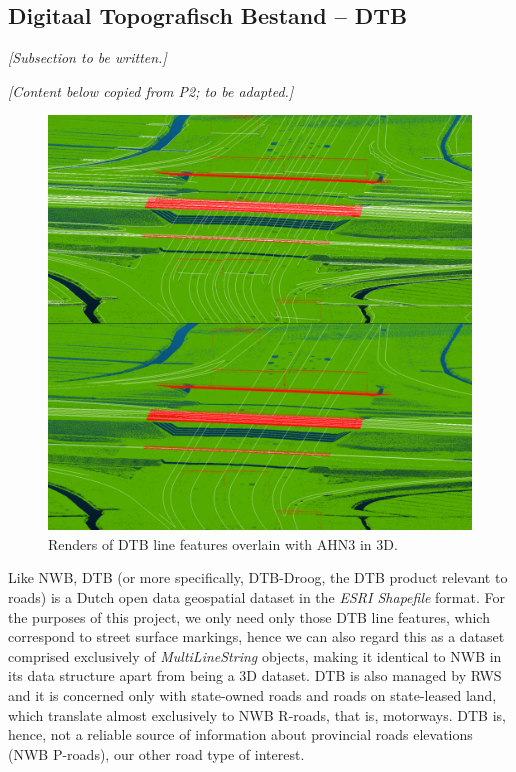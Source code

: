 \subsection{Digitaal Topografisch Bestand – DTB}
\label{sub:dtb}

\textit{[Subsection to be written.]}

\textit{[Content below copied from P2; to be adapted.]}

\begin{figure}[h!]
    \centering
    \includegraphics[width=0.95\linewidth]{final_report/figs/ahn_sample_10.png} 
    \caption{Renders of DTB line features overlain with AHN3 in 3D.}
    \label{fig:dtbahn}
\end{figure}

Like NWB, DTB (or more specifically, DTB-Droog, the DTB product relevant to roads) is a Dutch open data geospatial dataset in the \textit{ESRI Shapefile} format. For the purposes of this project, we only need only those DTB line features, which correspond to street surface markings, hence we can also regard this as a dataset comprised exclusively of \textit{MultiLineString} objects, making it identical to NWB in its data structure apart from being a 3D dataset. DTB is also managed by RWS and it is concerned only with state-owned roads and roads on state-leased land, which translate almost exclusively to NWB R-roads, that is, motorways. DTB is, hence, not a reliable source of information about provincial roads elevations (NWB P-roads), our other road type of interest.

